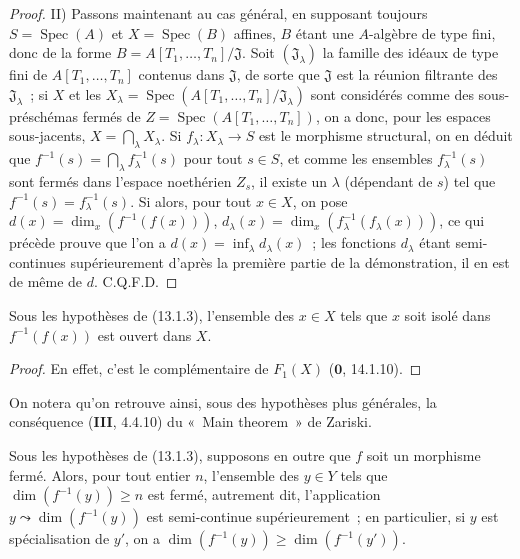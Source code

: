 \begin{proof}
II) Passons maintenant au cas général, en supposant toujours
$S=\operatorname{Spec}(A)$ et $X=\operatorname{Spec}(B)$ affines, $B$ étant
une $A$-algèbre de type fini, donc de la forme
$B=A[T_1,\ldots,T_n]/\mathfrak J$. Soit $(\mathfrak J_\lambda)$ la famille des
idéaux de type fini de $A[T_1,\ldots,T_n]$ contenus dans $\mathfrak J$, de
sorte que $\mathfrak J$ est la réunion filtrante des $\mathfrak J_\lambda$~;
si $X$ et les
$X_\lambda=\operatorname{Spec}(A[T_1,\ldots,T_n]/\mathfrak J_\lambda)$ sont
considérés comme des sous-préschémas fermés de
$Z=\operatorname{Spec}(A[T_1,\ldots,T_n])$, on a donc, pour les espaces
sous-jacents, $X=\bigcap_\lambda X_\lambda$. Si $f_\lambda:X_\lambda\to S$ est
le morphisme structural, on en déduit que
$f^{-1}(s)=\bigcap_\lambda f_\lambda^{-1}(s)$ pour tout $s\in S$, et comme les
ensembles $f_\lambda^{-1}(s)$ sont fermés dans l'espace noethérien $Z_s$, il
existe un $\lambda$ (dépendant de $s$) tel que
$f^{-1}(s)=f_\lambda^{-1}(s)$. Si alors, pour tout $x\in X$, on pose
$d(x)=\dim_x(f^{-1}(f(x)))$, $d_\lambda(x)=\dim_x(f_\lambda^{-1}(f_\lambda(x)))$,
ce qui précède prouve que l'on a $d(x)=\inf_\lambda d_\lambda(x)$~; les
fonctions $d_\lambda$ étant semi-continues supérieurement d'après la première
partie de la démonstration, il en est de même de $d$. C.Q.F.D.
\end{proof}

\begin{corollary}[13.1.4]
Sous les hypothèses de \textup{(13.1.3)}, l'ensemble des $x\in X$ tels que $x$ soit
isolé dans $f^{-1}(f(x))$ est ouvert dans $X$.
\end{corollary}

\begin{proof}
En effet, c'est le complémentaire de $F_1(X)$ ($\mathbf 0$, 14.1.10).
\end{proof}

On notera qu'on retrouve ainsi, sous des hypothèses plus générales, la
conséquence (\textbf{III}, 4.4.10) du «~Main theorem~» de Zariski.

\begin{corollary}[13.1.5]
\label{IV.13.1.5-fr}
Sous les hypothèses de \textup{(13.1.3)}, supposons en outre que $f$ soit un morphisme
fermé. Alors, pour tout entier $n$, l'ensemble des $y\in Y$ tels que
$\dim(f^{-1}(y))\geq n$ est fermé, autrement dit, l'application
$y\leadsto\dim(f^{-1}(y))$ est semi-continue supérieurement~; en particulier,
si $y$ est spécialisation de $y'$, on a
$\dim(f^{-1}(y))\geq\dim(f^{-1}(y'))$.
\end{corollary}

